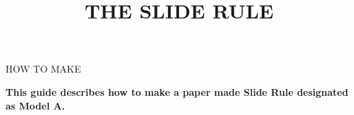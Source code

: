 
\newcommand{\makefulltitle}{How To Make The Slide Rule }



\title{\fontsize{60}{60}\selectfont THE SLIDE RULE}
\preauthor{}\postauthor{}\author{}
\predate{}\postdate{}\date{}


  \begin{center}
    \headingfont\fontsize{20}{20}\selectfont HOW TO MAKE
  \end{center}

  {\let\newpage\relax\maketitle}%
  \nosection{}
  \large\textbf{\makeperex This guide describes how to make a paper made Slide Rule designated as Model A.}

